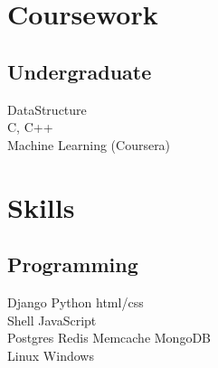 \documentclass[]{deedy-resume-openfont}
\begin{document}
\begin{minipage}[t]{0.33\textwidth}

\section{Coursework}

\subsection{Undergraduate}
DataStructure \\
C, C++ \\
Machine Learning (Coursera) \\
\sectionsep


\section{Skills}
\subsection{Programming}
Django \textbullet{} Python \break \textbullet{} html/css \\
Shell \textbullet{} JavaScript \\
Postgres \textbullet{} Redis \textbullet{} Memcache \break \textbullet{} MongoDB \\
Linux \textbullet{} Windows \\
\sectionsep

%
%

\end{minipage}
\hfill
\end{document}
